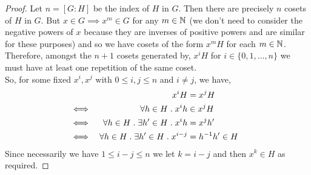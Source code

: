 \documentclass[MathsNotesBase.tex]{subfiles}
\begin{document}
{		\medskip
		\begin{proof}
			Let ${ n = [G : H] }$ be the index of $H$ in $G$. Then there are precisely $n$ cosets of $H$ in $G$. But ${ x \in G \implies x^m \in G }$ for any ${ m \in \mathbb{N}^{} }$ (we don't need to consider the negative powers of $x$ because they are inverses of positive powers and are similar for these purposes) and so we have cosets of the form ${ x^mH }$ for each ${ m \in \mathbb{N}^{} }$. Therefore, amongst the ${ n+1 }$ cosets generated by, ${ x^iH }$ for ${ i \in \{0,1,\dots, n\} }$ we must have at least one repetition of the same coset.\\
				So, for some fixed ${ x^i, x^j }$ with ${ 0 \leq i,j \leq n }$ and ${ i \neq j }$, we have,
				\begin{align*}
				&& x^iH &= x^jH & \\
				&\iff & \forall h \in H \;.\; x^ih &\in x^jH & \\
				&\iff & \forall h \in H \;.\; \exists h' \in H \;.\; x^ih &= x^jh' &\text{\scriptsize{}} \\
				&\iff & \forall h \in H \;.\; \exists h' \in H \;.\; x^{i-j} &= {h}^{-1}h' \in H &\text{\scriptsize{}} \\
				\end{align*}
			Since necessarily we have ${ 1 \leq i-j \leq n }$ we let ${ k = i-j }$ and then ${ x^k \in H }$ as required.
		\end{proof}
	
}
\end{document}
